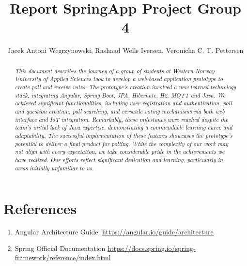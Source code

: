 \documentclass[11pt]{article}
\begin{document}
\title{Report SpringApp Project Group 4}

\author{Jacek Antoni Wegrzynowski, Rashaad Wells Iversen, Veronicha C. T. Pettersen }

\maketitle

\begin{abstract}

\noindent \textit{This document describes the journey of a group of students at Western Norway University of Applied Sciences took to develop a web-based application prototype to create poll and receive votes.  The prototype's creation involved a new learned technology stack, integrating Angular, Spring Boot, JPA, Hibernate, H2, MQTT and Java.  We achieved significant functionalities, including user registration and authentication, poll and question creation, poll searching, and versatile voting mechanisms via both web interface and IoT integration.  Remarkably, these milestones were reached despite the team's initial lack of Java expertise, demonstrating a commendable learning curve and adaptability.  The successful implementation of these features showcases the prototype's potential to deliver a final product for polling.  While the complexity of our work may not align with every expectation, we take considerable pride in the achievements we have realized.  Our efforts reflect significant dedication and learning, particularly in areas initially unfamiliar to us.}

\end{abstract}

%













\section*{References}
\begin{enumerate}
	\item Angular Architecture Guide: \url{https://angular.io/guide/architecture }
	\item Spring Official Documentation \url{https://docs.spring.io/spring-framework/reference/index.html}
\end{enumerate}


{}
\end{document}
